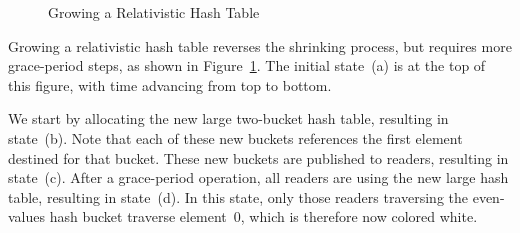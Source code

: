 \begin{figure}[tb]
\centering
{}
\caption{Growing a Relativistic Hash Table}
\label{fig:datastruct:Growing a Relativistic Hash Table}
\end{figure}

Growing a relativistic hash table reverses the shrinking process,
but requires more grace-period steps, as shown in
Figure~\ref{fig:datastruct:Growing a Relativistic Hash Table}.
The initial state~(a) is at the top of this figure, with time advancing
from top to bottom.

We start by allocating the new large two-bucket hash table, resulting
in state~(b).
Note that each of these new buckets references the first element destined
for that bucket.
These new buckets are published to readers, resulting in state~(c).
After a grace-period operation, all readers are using the new large
hash table, resulting in state~(d).
In this state, only those readers traversing the even-values hash bucket
traverse element~0, which is therefore now colored white.


